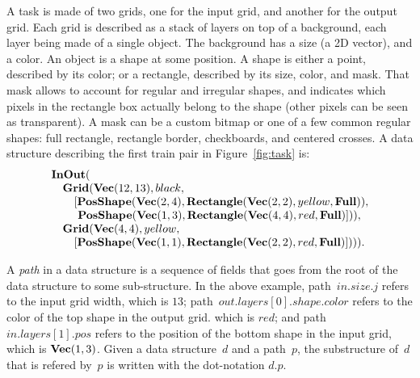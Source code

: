 \documentclass[a4paper]{llncs}
\begin{document}
A task is made of two grids, one for the input grid, and another for
the output grid.
%
Each grid is described as a stack of layers on top of a background,
each layer being made of a single object. The background has a size (a
2D vector), and a color.
%
An object is a shape at some position. A shape is either a point,
described by its color; or a rectangle, described by its size, color,
and mask. That mask allows to account for regular and irregular
shapes, and indicates which pixels in the rectangle box actually
belong to the shape (other pixels can be seen as transparent).
%
A mask can be a custom bitmap or one of a few common regular shapes:
full rectangle, rectangle border, checkboards, and centered crosses.
%
A data structure describing the first train pair in Figure~\ref{fig:task}
is:
\[\begin{array}{l}
    {\bf InOut}( \\
    \quad {\bf Grid}({\bf Vec}(12,13), black,\\
    \quad \quad [{\bf PosShape}({\bf Vec}(2,4), {\bf Rectangle}({\bf Vec}(2,2), yellow, {\bf Full})),\\
    \quad \quad ~{\bf PosShape}({\bf Vec}(1,3), {\bf Rectangle}({\bf Vec}(4,4), red, {\bf Full})])), \\
    \quad {\bf Grid}({\bf Vec}(4,4), yellow, \\
    \quad \quad [{\bf PosShape}({\bf Vec}(1,1), {\bf Rectangle}({\bf Vec}(2,2), red, {\bf Full})]))).
  \end{array} \]

A {\em path} in a data structure is a sequence of fields that goes
from the root of the data structure to some sub-structure. In the
above example, path~$in.size.j$ refers to the input grid width, which
is $13$; path~$out.layers[0].shape.color$ refers to the color of the top
shape in the output grid. which is $red$; and path~$in.layers[1].pos$
refers to the position of the bottom shape in the input grid, which is
${\bf Vec}(1,3)$. Given a data structure~$d$ and a path~$p$, the
substructure of~$d$ that is refered by~$p$ is written with the
dot-notation $d.p$.
\end{document}
